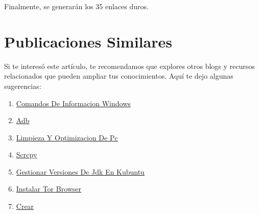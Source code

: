 \documentclass[
  jou,
  floatsintext,
  longtable,
  a4paper,
  nolmodern,
  notxfonts,
  notimes,
  12pt,
  colorlinks=true,linkcolor=blue,citecolor=blue,urlcolor=blue]{apa7}
\providecommand{\tightlist}{%
  \setlength{\itemsep}{0pt}\setlength{\parskip}{0pt}}
\begin{document}
Finalmente, se generarán los 35 enlaces duros.

\section{Publicaciones Similares}\label{publicaciones-similares}

Si te interesó este artículo, te recomendamos que explores otros blogs y
recursos relacionados que pueden ampliar tus conocimientos. Aquí te dejo
algunas sugerencias:

\begin{enumerate}
\def\labelenumi{\arabic{enumi}.}
\tightlist
\item
  \href{https://chaska-x.netlify.app/operating-system/2017-05-21-comandos-de-informacion-windows/index.pdf}{}
  \href{https://chaska-x.netlify.app/operating-system/2017-05-21-comandos-de-informacion-windows}{Comandos
  De Informacion Windows}
\item
  \href{https://chaska-x.netlify.app/operating-system/2019-06-19-adb/index.pdf}{}
  \href{https://chaska-x.netlify.app/operating-system/2019-06-19-adb}{Adb}
\item
  \href{https://chaska-x.netlify.app/operating-system/2021-08-17-limpieza-y-optimizacion-de-pc/index.pdf}{}
  \href{https://chaska-x.netlify.app/operating-system/2021-08-17-limpieza-y-optimizacion-de-pc}{Limpieza
  Y Optimizacion De Pc}
\item
  \href{https://chaska-x.netlify.app/operating-system/2021-10-21-scrcpy/index.pdf}{}
  \href{https://chaska-x.netlify.app/operating-system/2021-10-21-scrcpy}{Scrcpy}
\item
  \href{https://chaska-x.netlify.app/operating-system/2022-05-12-gestionar-versiones-de-jdk-en-kubuntu/index.pdf}{}
  \href{https://chaska-x.netlify.app/operating-system/2022-05-12-gestionar-versiones-de-jdk-en-kubuntu}{Gestionar
  Versiones De Jdk En Kubuntu}
\item
  \href{https://chaska-x.netlify.app/operating-system/2022-07-21-instalar-tor-browser/index.pdf}{}
  \href{https://chaska-x.netlify.app/operating-system/2022-07-21-instalar-tor-browser}{Instalar
  Tor Browser}
\item
  \href{https://chaska-x.netlify.app/operating-system/2022-08-14-crear-enlaces-duros-o-hard-link-en-linux/index.pdf}{}
  \href{https://chaska-x.netlify.app/operating-system/2022-08-14-crear-enlaces-duros-o-hard-link-en-linux}{Crear
}
\end{enumerate}
\end{document}
